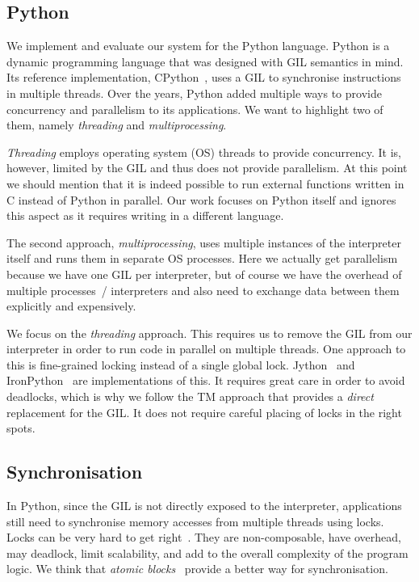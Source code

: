 \documentclass{sigplanconf}
\begin{document}
\subsection{Python}

We implement and evaluate our system for the Python language. Python
is a dynamic programming language that was designed with GIL semantics
in mind. Its reference implementation, CPython~\cite{cpython}, uses a
GIL to synchronise instructions in multiple threads.
Over the years, Python added multiple ways to provide concurrency and
parallelism to its applications. We want to highlight two of them,
namely \emph{threading} and \emph{multiprocessing}.

\emph{Threading} employs operating system (OS) threads to provide
concurrency. It is, however, limited by the GIL and thus does not
provide parallelism. At this point we should mention that it is indeed
possible to run external functions written in C instead of Python in
parallel. Our work focuses on Python itself and ignores this aspect as
it requires writing in a different language.

The second approach, \emph{multiprocessing}, uses multiple instances
of the interpreter itself and runs them in separate OS processes.
Here we actually get parallelism because we have one GIL per
interpreter, but of course we have the overhead of multiple processes~/
interpreters and also need to exchange data between them explicitly
and expensively.

We focus on the \emph{threading} approach. This requires us to remove
the GIL from our interpreter in order to run code in parallel on
multiple threads. One approach to this is fine-grained locking instead
of a single global lock. Jython~\cite{webjython} and
IronPython~\cite{ironpython} are implementations of this. It requires
great care in order to avoid deadlocks, which is why we follow the TM
approach that provides a \emph{direct} replacement for the GIL. It
does not require careful placing of locks in the right spots.


\subsection{Synchronisation}

In Python, since the GIL is not directly exposed to the interpreter,
applications still need to synchronise memory accesses from multiple
threads using locks. Locks can be very hard to get
right~\cite{christopher10,victor11,shan08}.  They are non-composable,
have overhead, may deadlock, limit scalability, and add to the overall
complexity of the program logic. We think that \emph{atomic
blocks}~\cite{tim03,tim05} provide a better way for synchronisation.
\end{document}
